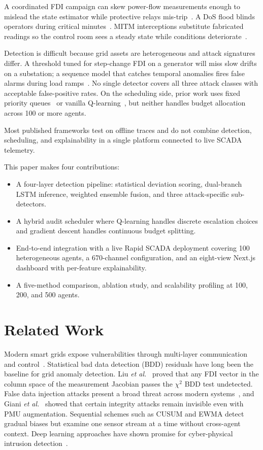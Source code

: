 \documentclass[conference,a4paper]{IEEEtran}
\begin{document}
A coordinated FDI campaign can skew power-flow measurements enough to mislead the state estimator while protective relays mis-trip~\cite{b2}. A DoS flood blinds operators during critical minutes~\cite{b3}. MITM interceptions substitute fabricated readings so the control room sees a steady state while conditions deteriorate~\cite{b4}.

Detection is difficult because grid assets are heterogeneous and attack signatures differ. A threshold tuned for step-change FDI on a generator will miss slow drifts on a substation; a sequence model that catches temporal anomalies fires false alarms during load ramps~\cite{b5}. No single detector covers all three attack classes with acceptable false-positive rates. On the scheduling side, prior work uses fixed priority queues~\cite{b6} or vanilla Q-learning~\cite{b7}, but neither handles budget allocation across 100 or more agents.

Most published frameworks test on offline traces and do not combine detection, scheduling, and explainability in a single platform connected to live SCADA telemetry.

This paper makes four contributions:
\begin{itemize}
\item A four-layer detection pipeline: statistical deviation scoring, dual-branch LSTM inference, weighted ensemble fusion, and three attack-specific sub-detectors.
\item A hybrid audit scheduler where Q-learning handles discrete escalation choices and gradient descent handles continuous budget splitting.
\item End-to-end integration with a live Rapid SCADA deployment covering 100 heterogeneous agents, a 670-channel configuration, and an eight-view Next.js dashboard with per-feature explainability.
\item A five-method comparison, ablation study, and scalability profiling at 100, 200, and 500 agents.
\end{itemize}

\section{Related Work}

Modern smart grids expose vulnerabilities through multi-layer communication and control~\cite{b1}. Statistical bad data detection (BDD) residuals have long been the baseline for grid anomaly detection. Liu \textit{et al.}~\cite{b2} proved that any FDI vector in the column space of the measurement Jacobian passes the $\chi^2$ BDD test undetected. False data injection attacks present a broad threat across modern systems~\cite{b3}, and Giani \textit{et al.}~\cite{b4} showed that certain integrity attacks remain invisible even with PMU augmentation. Sequential schemes such as CUSUM and EWMA detect gradual biases but examine one sensor stream at a time without cross-agent context. Deep learning approaches have shown promise for cyber-physical intrusion detection~\cite{b5}.
\end{document}
